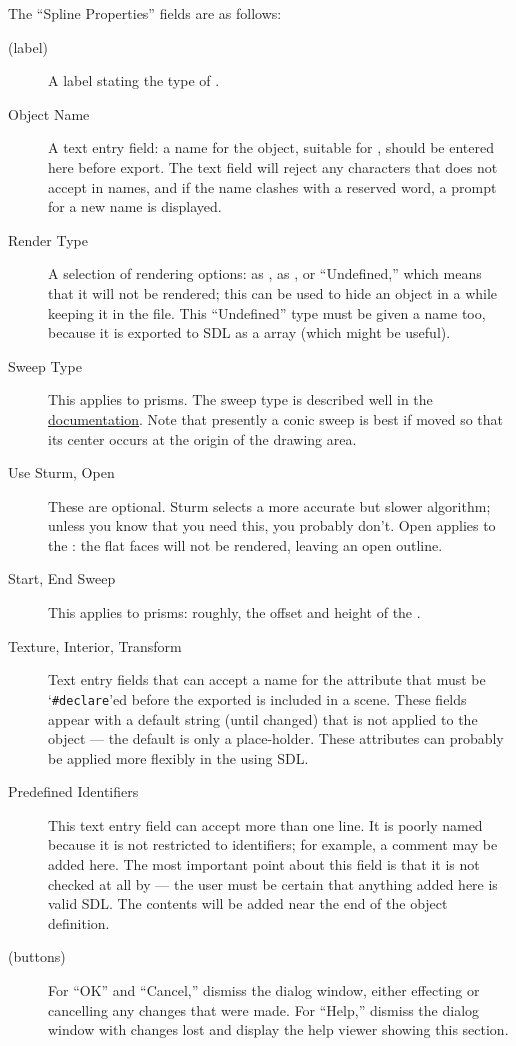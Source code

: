 		The ``Spline Properties''  fields are as follows:
		\begin{description}
		  \item[(label)] A label stating the type of \IXspline{}.
		  \item[Object Name] A text entry field: a name
			for the object, suitable for \IXpov{} ,
			should be entered here before export. The text
			field will reject any characters that \IXpov{}
			does not accept in names, and if the name clashes
			with a \IXpov{} reserved word, a prompt for a
			new name is displayed.
		  \item[Render Type] A selection of rendering options:
			as \IXlathe{}, as \IXprism{}, or ``Undefined,''
			which means that it will not
			be rendered; this can be used to hide an object in
			a \IXpov{}  while keeping it in the
			\IXpkg{} file. This ``Undefined'' type must be given
			a name too, because it is exported to SDL as a \IXpov{}
			array (which might be useful).
		  \item[Sweep Type] This applies to prisms. The sweep
			type is described well in the \IXpov{}
			\href{\URLPOVdocsPrism}{\IXprism{} documentation}.
			Note that presently a conic sweep \IXprism{} is best
			if moved so that its center occurs at the origin
			of the \IXpkg{} drawing area.
		  \item[Use Sturm, Open] These are optional. Sturm selects
			a more accurate but slower algorithm; unless you
			know that you need this, you probably don't.
			Open applies to the \IXprism{}: the flat faces will not
			be rendered, leaving an open outline.
		  \item[Start, End Sweep] This applies to prisms:
			roughly, the offset and height of the \IXprism{}.
		  \item[Texture, Interior, Transform] Text entry
			fields that can accept a name for the attribute
			that must be
			`\verb!#declare!'ed
			before the exported  is included
			in a scene. These fields appear with a default
			string (until changed) that is not applied to
			the object --- the default is only a place-holder.
			These attributes can probably be applied more
			flexibly in the using SDL.				
		  \item[Predefined Identifiers] This text entry field
			can accept more than one line. It is poorly named
			because it is not restricted to identifiers;
			for example, a comment may be added here.
			The most important point about this field is
			that it is not checked at all by \IXpkg{} ---
			the user must be certain that anything added here
			is valid SDL. The contents will be added near the
			end of the object definition.
		  \item[(buttons)] For ``OK'' and ``Cancel,''
			dismiss the dialog window, either
			effecting or cancelling any changes that were made.
			For ``Help,'' dismiss the dialog window with changes lost
			and display the help viewer showing this section.
		\end{description}

